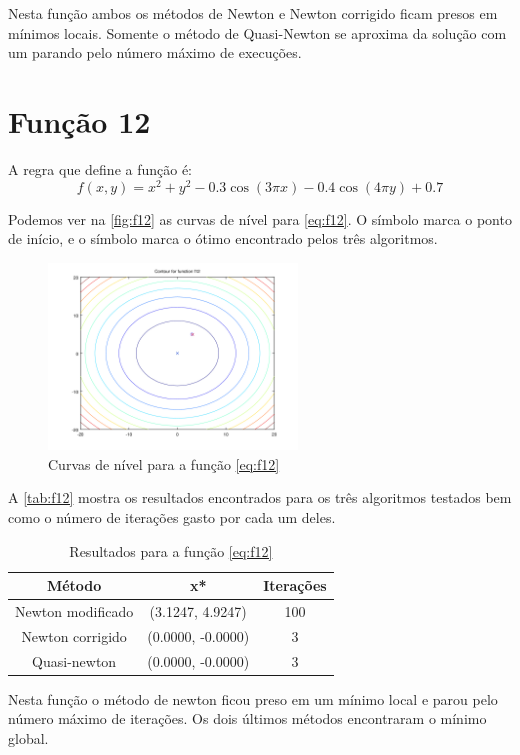 \documentclass[12pt]{article}
\begin{document}
Nesta função ambos os métodos de Newton e Newton corrigido ficam presos em mínimos locais. Somente o método de Quasi-Newton se aproxima da solução
com um parando pelo número máximo de execuções.

\section{Função 12}
A regra que define a função é:
\begin{equation}
\label{eq:f12}
f(x, y) = x^2 + y^2 - 0.3\cos(3\pi x) - 0.4\cos(4\pi y) + 0.7
\end{equation}

Podemos ver na \autoref{fig:f12} as curvas de nível para \autoref{eq:f12}. O símbolo \textit{\textopenbullet} marca o ponto de início,
e o símbolo \textit{\texttimes} marca o ótimo encontrado pelos três algoritmos.

\begin{figure}[H]
  \centering
  \includegraphics[width=250px]{../matlab/images/f12_contour}
  \caption{Curvas de nível para a função \autoref{eq:f12}}
  \label{fig:f12}
\end{figure}

A \autoref{tab:f12} mostra os resultados encontrados para os três algoritmos testados bem como o número de iterações gasto por cada um deles.

\begin{table}[H]
\centering
\begin{tabular}{*3c}
\toprule
Método			&	x*		&	Iterações\\
\midrule
Newton modificado	&	 (3.1247, 4.9247)	&	100\\
Newton corrigido	&	(0.0000, -0.0000)	&	3\\
Quasi-newton		&	(0.0000, -0.0000)	&	3\\
\bottomrule
\end{tabular}
\caption{\small{Resultados para a função \autoref{eq:f12} }}
\label{tab:f12}
\end{table}

Nesta função o método de newton ficou preso em um mínimo local e parou pelo número máximo de iterações. Os dois últimos métodos encontraram 
o mínimo global.
\end{document}
